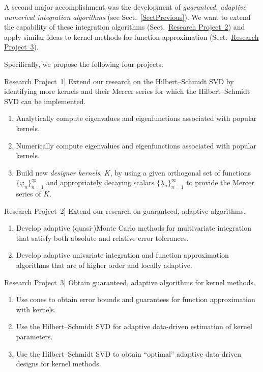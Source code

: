 \documentclass[11pt]{NSFamsart}
\newcommand{\refproba}{\hyperref[SectHSSVD]{Research Project~1}\xspace}
\newcommand{\refprobb}{\hyperref[SectGAIL]{Research Project~2}\xspace}
\newcommand{\refprobc}{\hyperref[combinesec]{Research Project~3}\xspace}
\begin{document}
A second major accomplishment was the development of \emph{guaranteed, adaptive numerical integration algorithms} \citep{HicEtal14b,HicJim16a,HicEtal14a,JimHic16a} (see Sect.~\ref{SectPrevious}).  We want to extend the capability of these integration algorithms  (Sect.\ \refprobb) and apply similar ideas to kernel methods for function approximation (Sect.\ \refprobc).

Specifically, we propose the following four projects:

\begin{description}[leftmargin=2.5ex]

\item[\refproba] Extend our research on the Hilbert--Schmidt SVD by identifying more kernels and their Mercer series for which the Hilbert--Schmidt SVD can be implemented.
\begin{enumerate}
\renewcommand{\labelenumi}{1.\arabic{enumi}.}
\item Analytically compute eigenvalues and eigenfunctions associated with popular kernels.
\item Numerically compute eigenvalues and eigenfunctions associated with popular kernels.
\item Build new \emph{designer kernels}, $K$, by using a given orthogonal set of functions $\{\varphi_n\}_{n=1}^\infty$ and appropriately decaying scalars $\{\lambda_n\}_{n=1}^\infty$ to provide the Mercer series of $K$.
\end{enumerate}

\item[\refprobb] Extend our research on guaranteed, adaptive algorithms.
\begin{enumerate}
\renewcommand{\labelenumi}{2.\arabic{enumi}.}
\item Develop adaptive (quasi-)Monte Carlo methods for multivariate integration that satisfy both absolute and relative error tolerances.
\item Develop adaptive univariate integration and function approximation algorithms that are of higher order and locally adaptive.
\end{enumerate}

\item[\refprobc] Obtain guaranteed, adaptive algorithms for kernel methods.
\begin{enumerate}
\renewcommand{\labelenumi}{3.\arabic{enumi}.}
\item Use cones to obtain error bounds and guarantees for function approximation with kernels.
\item Use the Hilbert--Schmidt SVD for adaptive data-driven estimation of kernel parameters.
\item Use the Hilbert--Schmidt SVD to obtain ``optimal'' adaptive data-driven designs for kernel methods.
\end{enumerate}


\end{description}
\end{document}
